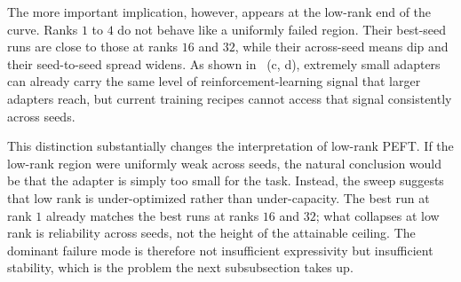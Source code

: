 The more important implication, however, appears at the low-rank end of the curve. Ranks $1$ to $4$ do not behave like a uniformly failed region. Their best-seed runs are close to those at ranks $16$ and $32$, while their across-seed means dip and their seed-to-seed spread widens. As shown in ~(c, d), extremely small adapters can already carry the same level of reinforcement-learning signal that larger adapters reach, but current training recipes cannot access that signal consistently across seeds.

This distinction substantially changes the interpretation of low-rank PEFT. If the low-rank region were uniformly weak across seeds, the natural conclusion would be that the adapter is simply too small for the task. Instead, the sweep suggests that low rank is under-optimized rather than under-capacity. The best run at rank $1$ already matches the best runs at ranks $16$ and $32$; what collapses at low rank is reliability across seeds, not the height of the attainable ceiling. The dominant failure mode is therefore not insufficient expressivity but insufficient stability, which is the problem the next subsubsection takes up.

